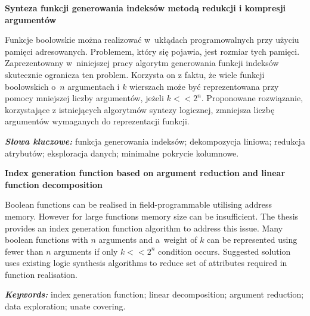 \newpage
\vspace{10cm}

\newpage
\begin{center}
	\textbf{Synteza funkcji generowania indeksów metodą redukcji i kompresji argumentów}
\end{center}

Funkcje boolowskie można realizować w~ukłądach programowalnych przy użyciu pamięci adresowanych.
Problemem, który się pojawia, jest rozmiar tych pamięci.
Zaprezentowany w~niniejszej pracy algorytm generowania funkcji indeksów skutecznie ogranicza ten problem.
Korzysta on z faktu,
że wiele funkcji boolowskich o~$n$ argumentach i $k$ wierszach może być reprezentowana przy pomocy mniejszej liczby argumentów,
jeżeli $k<<2^n$.
Proponowane rozwiązanie,
korzystające z istniejących algorytmów syntezy logicznej,
zmniejsza liczbę argumentów wymaganych do reprezentacji funkcji.

\textit{\textbf{Słowa kluczowe:}} funkcja generowania indeksów; dekompozycja liniowa; redukcja atrybutów; eksploracja danych; minimalne pokrycie kolumnowe.

	\vspace{1cm}

\begin{center}
    \textbf{Index generation function based on argument reduction and linear function decomposition}
\end{center}

Boolean functions can be realised in field-programmable utilising address memory.
However for large functions memory size can be insufficient.
The thesis provides an index generation function algorithm to address this issue.
Many boolean functions with $n$ arguments and a~weight of $k$ can be represented using fewer than $n$ arguments if only $k<<2^n$ condition occurs.
Suggested solution uses existing logic synthesis algorithms to reduce set of attributes required in function realisation.

\textit{\textbf{Keywords:}} index generation function; linear decomposition; argument reduction; data exploration; unate covering.

